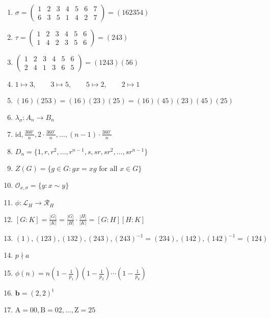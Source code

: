 \documentclass[oneside,10pt,]{article}
\newcommand{\identity}{\mathrm{id}}
\newcommand{\notdivide}{\nmid}
\newcommand{\transpose}{\text{t}}
\begin{document}
\begin{enumerate}
\item{}\(\displaystyle \sigma = \begin{pmatrix} 1 & 2 & 3 & 4 & 5 & 6 & 7\\ 6 & 3 & 5 & 1 & 4 & 2 & 7 \end{pmatrix} = (1 6 2 3 5 4 )\)%
\item{}\(\displaystyle \tau = \begin{pmatrix} 1 & 2 & 3 & 4 & 5 & 6 \\ 1 & 4 & 2 & 3 & 5 & 6 \end{pmatrix} = (2 4 3)\)%
\item{}\(\displaystyle \begin{pmatrix} 1 & 2 & 3 & 4 & 5 & 6 \\ 2 & 4 & 1 & 3 & 6 & 5 \end{pmatrix} = (1 2 4 3)(5 6)\)%
\item{}\(\displaystyle 1 \mapsto 3, \qquad 3 \mapsto 5, \qquad 5 \mapsto 2, \qquad 2 \mapsto 1\)%
\item{}\(\displaystyle ( 1 6 ) (2 5 3) = (1 6 )( 2 3 )( 2 5 ) = (1 6 )( 4 5 )(2 3 )( 4 5 )(2 5 )\)%
\item{}\(\displaystyle \lambda_{\sigma} : A_n \rightarrow B_n\)%
\item{}\(\displaystyle \identity, \frac{360^{\circ} }{n}, 2 \cdot \frac{360^{\circ} }{n}, \ldots, (n-1) \cdot \frac{360^{\circ} }{n}\)%
\item{}\(\displaystyle D_n = \{1, r, r^2, \ldots, r^{n-1}, s, sr, sr^2, \ldots, sr^{n-1}\}\)%
\item{}\(\displaystyle Z(G) = \{ g \in G : gx = xg \text{ for all } x \in G \}\)%
\item{}\(\displaystyle {\mathcal O}_{x, \sigma} = \{ y : x \sim y \}\)%
\item{}\(\displaystyle \phi : {\mathcal L}_H \rightarrow {\mathcal R}_H\)%
\item{}\(\displaystyle [G:K] = \frac{|G|}{|K|} = \frac{|G|}{|H|} \cdot \frac{|H|}{|K|} = [G:H][H:K]\)%
\item{}\(\displaystyle (1), (123), (132), (243), (243)^{-1} = (234), (142), (142)^{-1} = (124)\)%
\item{}\(\displaystyle p \notdivide a\)%
\item{}\(\displaystyle \phi(n) = n \left( 1 - \frac{1}{p_1} \right) \left( 1 - \frac{1}{p_2} \right)\cdots \left( 1 - \frac{1}{p_k} \right)\)%
\item{}\(\displaystyle {\mathbf b} = ( 2, 2)^\transpose\)%
\item{}\(\displaystyle \text{A} = 00, \text{B} = 02, \ldots, \text{Z}= 25\)%

\end{enumerate}
\end{document}
